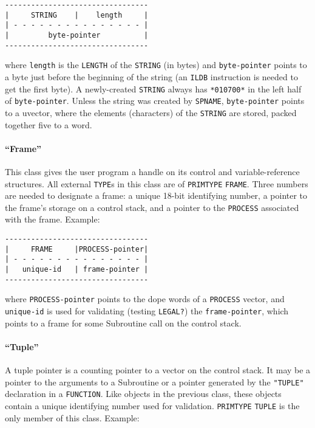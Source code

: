\documentclass[a4paper,]{article}
\let\oldparagraph\paragraph
\renewcommand{\paragraph}[1]{\oldparagraph{#1}\mbox{}}
\begin{document}
\begin{verbatim}
---------------------------------
|     STRING    |    length     |
| - - - - - - - - - - - - - - - |
|         byte-pointer          |
---------------------------------
\end{verbatim}

where \texttt{length} is the \texttt{LENGTH} of the \texttt{STRING} (in bytes) and \texttt{byte-pointer} points to a byte
just before the beginning of the string (an \texttt{ILDB} instruction is needed to get the first byte). A newly-created
\texttt{STRING} always has \texttt{*010700*} in the left half of \texttt{byte-pointer}. Unless the string was created by
\texttt{SPNAME}, \texttt{byte-pointer} points to a uvector, where the elements (characters) of the \texttt{STRING} are
stored, packed together five to a word.

\paragraph{\texorpdfstring{``Frame''}{Frame}}\label{frame}

This class gives the user program a handle on its control and variable-reference structures. All external \texttt{TYPE}s in
this class are of \texttt{PRIMTYPE} \texttt{FRAME}. Three numbers are needed to designate a frame: a unique 18-bit
identifying number, a pointer to the frame's storage on a control stack, and a pointer to the
\texttt{PROCESS} associated with the frame. Example:

\begin{verbatim}
---------------------------------
|     FRAME     |PROCESS-pointer|
| - - - - - - - - - - - - - - - |
|   unique-id   | frame-pointer |
---------------------------------
\end{verbatim}

where \texttt{PROCESS-pointer} points to the dope words of a \texttt{PROCESS} vector, and \texttt{unique-id} is used for
validating (testing \texttt{LEGAL?}) the \texttt{frame-pointer}, which points to a frame for some
Subroutine call on the control stack.

\paragraph{\texorpdfstring{``Tuple''}{Tuple}}\label{tuple}

A tuple pointer is a counting pointer to a vector on the control stack. It may be a pointer to the arguments to a
Subroutine or a pointer generated by the \texttt{"TUPLE"} declaration in a \texttt{FUNCTION}. Like objects in the previous
class, these objects contain a unique identifying number used for validation. \texttt{PRIMTYPE} \texttt{TUPLE} is the only
member of this class. Example:
\end{document}
